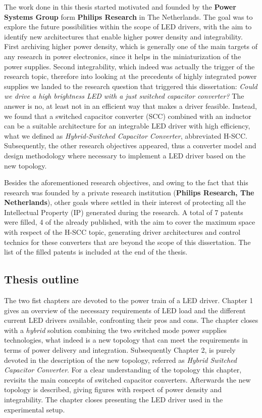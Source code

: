 The work done in this thesis started motivated and founded by the \textbf{Power Systems Group} form  \textbf{Philips Research} in The Netherlands. The goal was to explore the future possibilities within the scope of LED drivers, with the aim to identify new architectures that enable higher power density and integrability. First archiving higher power density, which is generally one of the main targets of any research in power electronics, since it helps in the miniaturization of the power supplies. Second integrability, which indeed was actually the trigger of the research topic, therefore into looking at the precedents of highly integrated power supplies we landed to the research question that triggered this dissertation: \emph{Could we drive a high brightness LED with a just switched capacitor converter?} The answer is no, at least not in an efficient way that makes a driver feasible. Instead, we found that a switched capacitor converter (SCC) combined with an inductor can be a suitable architecture for an integrable LED driver with high efficiency, what we defined as \emph{Hybrid-Switched Capacitor Converter}, abbreviated H-SCC. Subsequently, the other research objectives appeared, thus a converter model and design methodology where necessary to implement a LED driver based on the new topology.

Besides the aforementioned research objectives, and owing to the fact that this research was founded by a private research institution (\textbf{Philips Research, The Netherlands}), other goals where settled in their interest of protecting all the Intellectual Property (IP) generated during the research. A total of 7 patents were filled, 4 of the already published, with the aim to cover the maximum space with respect of the H-SCC topic, generating driver architectures and control technics for these converters that are beyond the scope of this dissertation. The list of the filled patents is included at the end of the thesis. 

 
\subsection{Thesis outline}
The two fist chapters are devoted to the power train of a LED driver. Chapter 1 gives an overview of the necessary requirements of LED load and the different current LED drivers available, confronting their pros and cons. The chapter closes with a \emph{hybrid} solution combining the two switched mode power supplies technologies, what indeed is a new topology that can meet the requirements in terms of power delivery and integration. Subsequently Chapter 2, is purely devoted in the description of the new topology, referred as \emph{Hybrid Switched Capacitor Converter}. For a clear understanding of the topology this chapter, revisits the main concepts of switched capacitor converters. Afterwards the new topology is described, giving figures with respect of power density and integrability. The chapter closes presenting the LED driver used in the experimental setup.

